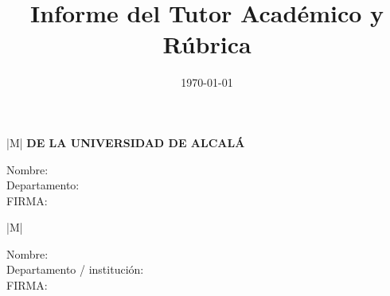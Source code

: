 \documentclass[10pt,a4paper,oneside]{article}
\title{Informe del Tutor Académico y Rúbrica}  %
\date{\today}                                  %
\author{\myAcademicTutorFullName}              %
\begin{document}
%
%




\newpage

\thispagestyle{plain}


\noindent
\begin{tabular}{|M{\textwidth}|}
\hline
\textbf{\small \MakeUppercase{\wordTutorOrTutora} \MakeUppercase{\wordAcademicoOrAcademica} DE LA UNIVERSIDAD DE ALCALÁ}\vspace*{-5pt}\\
\hline
\end{tabular}



\begin{description}
  \item[Nombre:] \myAcademicTutorFullName
  \item[Departamento:] \myAcademicTutorDepartment
  \item[FIRMA:]

\end{description}

\vspace{2.25cm}

\ifthenelse{\equal{\myCoTutorFullName}{}}
{
}
{

\noindent
\begin{tabular}{|M{\textwidth}|}
\hline
\textbf{\small \MakeUppercase{\wordCoTutorOrCoTutora}}\vspace*{-5.5pt}\\
\hline
\end{tabular}


\begin{description}
  \item[Nombre:] \myCoTutorFullName
  \item[Departamento / institución:] \AcademicCotutorAffiliation
  \item[FIRMA:]
\end{description}
}
\end{document}
